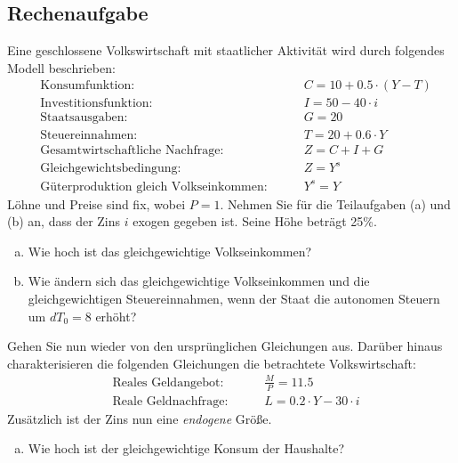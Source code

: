 \documentclass{scrartcl}
\begin{document}
\subsection{Rechenaufgabe}
Eine geschlossene Volkswirtschaft mit staatlicher Aktivit\"{a}t wird durch
folgendes Modell beschrieben:
\begin{align*}
    &\text{Konsumfunktion: } &\quad& C = 10 + 0.5\cdot (Y-T)\\
    &\text{Investitionsfunktion: } &\quad&I = 50-40\cdot i\\
    &\text{Staatsausgaben: } &\quad& G=20\\
    &\text{Steuereinnahmen: } &\quad& T=20 + 0.6\cdot Y\\
    &\text{Gesamtwirtschaftliche Nachfrage: } &\quad&Z = C + I + G\\
    &\text{Gleichgewichtsbedingung: } &\quad&Z = Y^s\\
    &\text{G\"{u}terproduktion gleich Volkseinkommen: } &\quad& Y^s = Y
\end{align*}
L\"{o}hne und Preise sind fix, wobei $P=1$. Nehmen Sie f\"{u}r die Teilaufgaben (a)
und (b) an, dass der Zins $i$ exogen gegeben ist. Seine H\"{o}he betr\"{a}gt 25\%.
\begin{enumerate}[(a)]
  \item Wie hoch ist das gleichgewichtige Volkseinkommen? %
  \item Wie \"{a}ndern sich das gleichgewichtige Volkseinkommen und die
      gleichgewichtigen Steuereinnahmen, wenn der Staat die autonomen
      Steuern um $d T_0 =8$ erh\"{o}ht? %
\end{enumerate}
Gehen Sie nun wieder von den urspr\"{u}nglichen Gleichungen aus.
      Dar\"{u}ber hinaus charakterisieren die folgenden Gleichungen die
      betrachtete Volkswirtschaft:
\begin{align*}
  &\text{Reales Geldangebot: } &\quad& \frac{M}{P}=11.5\\
  &\text{Reale Geldnachfrage: } &\quad& L= 0.2\cdot Y - 30\cdot i
\end{align*}
Zus\"{a}tzlich ist der Zins nun eine \emph{endogene} Gr\"{o}{\ss}e.
\begin{enumerate}[(c)]
  \item Wie hoch ist der gleichgewichtige Konsum der Haushalte? %
\end{enumerate}
\end{document}
